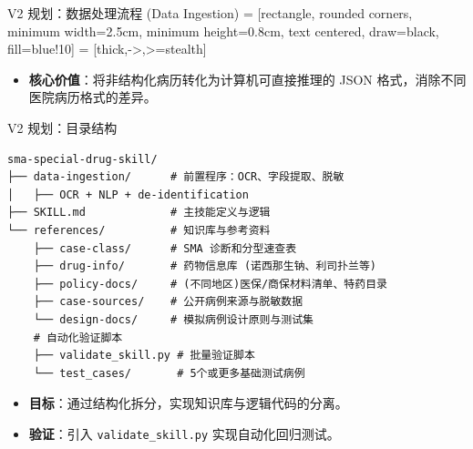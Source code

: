 \documentclass{beamer}
\begin{document}
\begin{frame}[fragile]{V2 规划：数据处理流程 (Data Ingestion)}
    \centering
     = [rectangle, rounded corners, minimum width=2.5cm, minimum height=0.8cm, text centered, draw=black, fill=blue!10]
     = [thick,->,>=stealth]


    \vspace{0.3cm}
    \begin{itemize}
        \item \small \textbf{核心价值}：将非结构化病历转化为计算机可直接推理的 JSON 格式，消除不同医院病历格式的差异。
    \end{itemize}
\end{frame}

\begin{frame}[fragile]{V2 规划：目录结构}
    \begin{verbatim}
sma-special-drug-skill/
├── data-ingestion/      # 前置程序：OCR、字段提取、脱敏
│   ├── OCR + NLP + de-identification
├── SKILL.md             # 主技能定义与逻辑
└── references/          # 知识库与参考资料
    ├── case-class/      # SMA 诊断和分型速查表
    ├── drug-info/       # 药物信息库 (诺西那生钠、利司扑兰等)
    ├── policy-docs/     # (不同地区)医保/商保材料清单、特药目录
    ├── case-sources/    # 公开病例来源与脱敏数据
    └── design-docs/     # 模拟病例设计原则与测试集
    # 自动化验证脚本
    ├── validate_skill.py # 批量验证脚本
    └── test_cases/       # 5个或更多基础测试病例
    \end{verbatim}
    \begin{itemize}
        \item \textbf{目标}：通过结构化拆分，实现知识库与逻辑代码的分离。
        \item \textbf{验证}：引入 \texttt{validate\_skill.py} 实现自动化回归测试。
    \end{itemize}
\end{frame}
\end{document}
